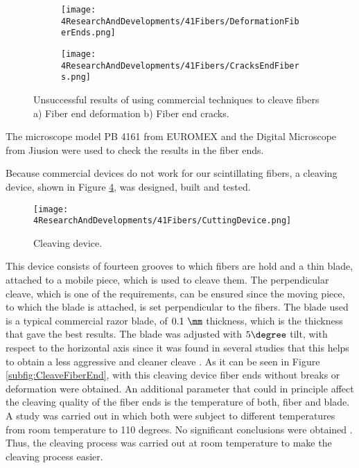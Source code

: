 \begin{figure}
\centering
    \begin{subfigure}[b]{0.5\textwidth}
    \centering
    \texttt{[image: 4ResearchAndDevelopments/41Fibers/DeformationFiberEnds.png]}  
    \caption{\label{subfig:FiberEndDeformation}}
    \end{subfigure}
    \hfill
    \begin{subfigure}[b]{0.45\textwidth}
    \centering
    \texttt{[image: 4ResearchAndDevelopments/41Fibers/CracksEndFibers.png]}  
    \caption{\label{subfig:FiberEndCracks}}
    \end{subfigure}
 \caption{Unsuccessful results of using commercial techniques to cleave fibers a) Fiber end deformation b) Fiber end cracks.}
 \label{fig:BadCleavesOfFibers}
\end{figure}

The microscope model PB 4161 from EUROMEX and the Digital Microscope from Jiusion were used to check the results in the fiber ends. 

Because commercial devices do not work for our scintillating fibers, a cleaving device, shown in Figure \ref{fig:CleaveTRITIUMDevice}, was designed, built and tested.

\begin{figure}[hbtp]
\centering
\texttt{[image: 4ResearchAndDevelopments/41Fibers/CuttingDevice.png]}
\caption{Cleaving device. \label{fig:CleaveTRITIUMDevice}}
\end{figure}

This device consists of fourteen grooves to which fibers are hold and a thin blade, attached to a mobile piece, which is used to cleave them. The perpendicular cleave, which is one of the requirements, can be ensured since the moving piece, to which the blade is attached, is set perpendicular to the fibers. The blade used is a typical commercial razor blade, of $0.1~\mm$ thickness, which is the thickness that gave the best results. The blade was adjusted with $5\degree$ tilt, with respect to the horizontal axis since it was found in several studies that this helps to obtain a less aggressive and cleaner cleave \cite{AngleBlade, TemperatureBlade}. As it can be seen in Figure \ref{subfig:CleaveFiberEnd}, with this cleaving device fiber ends without breaks or deformation were obtained. An additional parameter that could in principle affect the cleaving quality of the fiber ends is the temperature of both, fiber and blade. A study was carried out in which both were subject to different temperatures from room temperature to 110 degrees. No significant conclusions were obtained \cite{TFGAlberto}. Thus, the cleaving process was carried out at room temperature to make the cleaving process easier.

